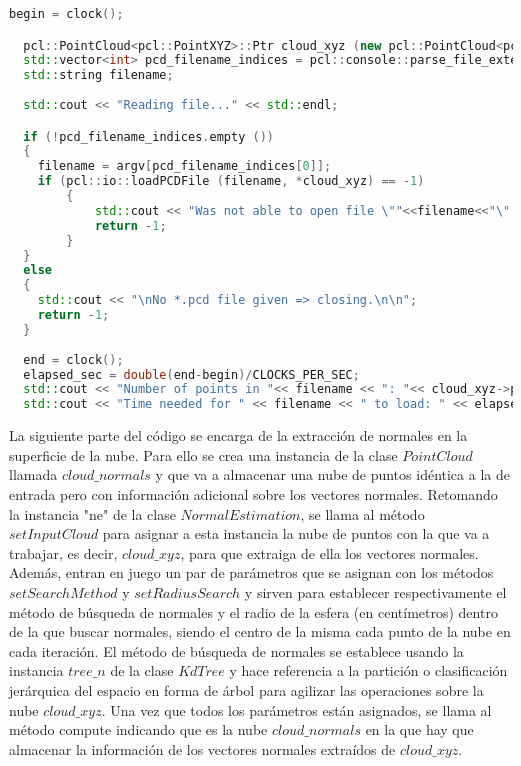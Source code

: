 \begin{lstlisting}[language=C++,breaklines]
  begin = clock();

  pcl::PointCloud<pcl::PointXYZ>::Ptr cloud_xyz (new pcl::PointCloud<pcl::PointXYZ>);
  std::vector<int> pcd_filename_indices = pcl::console::parse_file_extension_argument (argc, argv, "pcd"); 
  std::string filename;
     
  std::cout << "Reading file..." << std::endl;

  if (!pcd_filename_indices.empty ())
  {
  	filename = argv[pcd_filename_indices[0]];
  	if (pcl::io::loadPCDFile (filename, *cloud_xyz) == -1) 
    	{
        	std::cout << "Was not able to open file \""<<filename<<"\".\n";
       		return -1;
    	}
  }
  else
  {
  	std::cout << "\nNo *.pcd file given => closing.\n\n";
  	return -1;
  }
  
  end = clock();
  elapsed_sec = double(end-begin)/CLOCKS_PER_SEC;
  std::cout << "Number of points in "<< filename << ": "<< cloud_xyz->points.size () <<std::endl; 
  std::cout << "Time needed for " << filename << " to load: " << elapsed_sec << " seconds"<< std::endl << std::endl; 
\end{lstlisting}
  
  
La siguiente parte del código se encarga de la extracción de normales en la superficie de la nube. Para ello se crea una instancia de la clase $PointCloud$ llamada $cloud\_normals$ y que va a almacenar una nube de puntos idéntica a la de entrada pero con información adicional sobre los vectores normales.
Retomando la instancia "ne" de la clase $NormalEstimation$, se llama al método $setInputCloud$ para asignar a esta instancia la nube de puntos con la que va a trabajar, es decir, $cloud\_xyz$, para que extraiga de ella los vectores normales.
Además, entran en juego un par de parámetros que se asignan con los métodos $setSearchMethod$ y $setRadiusSearch$ y sirven para establecer respectivamente el método de búsqueda de normales y el radio de la esfera (en centímetros) dentro de la que buscar normales, siendo el centro de la misma cada punto de la nube en cada iteración.
El método de búsqueda de normales se establece usando la instancia $tree\_n$ de la clase $KdTree$ y hace referencia a la partición o clasificación jerárquica del espacio en forma de árbol para agilizar las operaciones sobre la nube $cloud\_xyz$.
Una vez que todos los parámetros están asignados, se llama al método compute indicando que es la nube $cloud\_normals$ en la que hay que almacenar la información de los vectores normales extraídos de $cloud\_xyz$.

